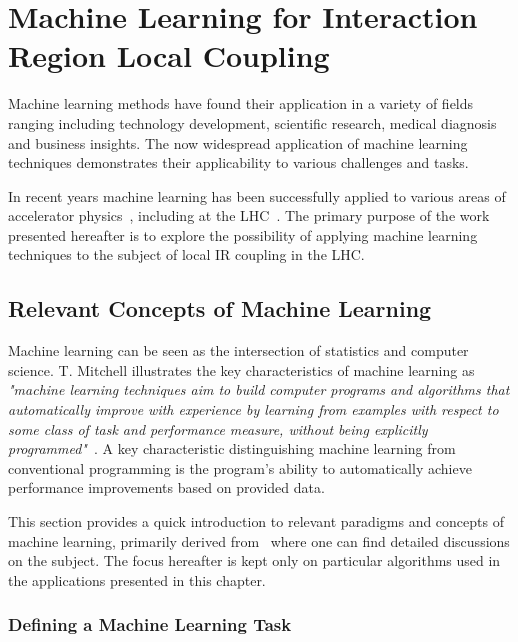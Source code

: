 \chapter{Machine Learning for Interaction Region Local Coupling} %
\label{chapter:ml_local_coupling} %

Machine learning methods have found their application in a variety of fields ranging including technology development, scientific research, medical diagnosis and business insights.
The now widespread application of machine learning techniques demonstrates their applicability to various challenges and tasks.

In recent years machine learning has been successfully applied to various areas of accelerator physics~\cite{}, including at the LHC~\cite{}.
The primary purpose of the work presented hereafter is to explore the possibility of applying machine learning techniques to the subject of local IR coupling in the LHC.


\section{Relevant Concepts of Machine Learning}

Machine learning can be seen as the intersection of statistics and computer science.
T. Mitchell illustrates the key characteristics of machine learning as \textit{"machine learning techniques aim to build computer programs and algorithms that automatically improve with experience by learning from examples with respect to some class of task and performance measure, without being explicitly programmed"}~\cite{BOOK:Mitchell:Machine_Learning}.
A key characteristic distinguishing machine learning from conventional programming is the program's ability to automatically achieve performance improvements based on provided data.

This section provides a quick introduction to relevant paradigms and concepts of machine learning, primarily derived from~\cite{BOOK:Mitchell:Machine_Learning,BOOK:Hastie:Elements_Statistical_Learning} where one can find detailed discussions on the subject.
The focus hereafter is kept only on particular algorithms used in the applications presented in this chapter.

\subsection{Defining a Machine Learning Task}

